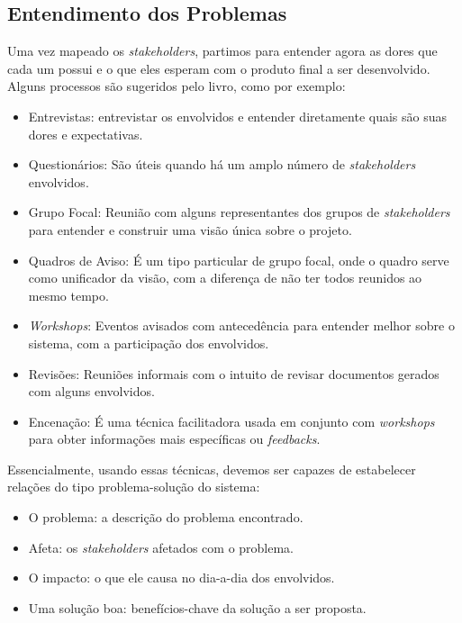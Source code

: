 \subsection{Entendimento dos Problemas}

Uma vez mapeado os \textit{stakeholders}, partimos para entender agora as dores que cada um possui e o que eles esperam com o produto final a ser desenvolvido. Alguns processos são sugeridos pelo livro\cite{kurtbittnerianspence2002}, como por exemplo:

\begin{itemize}
    \item Entrevistas: entrevistar os envolvidos e entender diretamente quais são suas dores e expectativas.
    \item Questionários: São úteis quando há um amplo número de \textit{stakeholders} envolvidos.
    \item Grupo Focal: Reunião com alguns representantes dos grupos de \textit{stakeholders} para entender e construir uma visão única sobre o projeto.
    \item Quadros de Aviso: É um tipo particular de grupo focal, onde o quadro serve como unificador da visão, com a diferença de não ter todos reunidos ao mesmo tempo.
    \item \textit{Workshops}: Eventos avisados com antecedência para entender melhor sobre o sistema, com a participação dos envolvidos.
    \item Revisões: Reuniões informais com o intuito de revisar documentos gerados com alguns envolvidos.
    \item Encenação: É uma técnica facilitadora usada em conjunto com \textit{workshops} para obter informações mais específicas ou \textit{feedbacks}.
\end{itemize}

Essencialmente, usando essas técnicas, devemos ser capazes de estabelecer relações do tipo problema-solução do sistema\cite{kurtbittnerianspence2002}:

\begin{itemize}
    \item O problema: a descrição do problema encontrado.
    \item Afeta: os \textit{stakeholders} afetados com o problema.
    \item O impacto: o que ele causa no dia-a-dia dos envolvidos.
    \item Uma solução boa: benefícios-chave da solução a ser proposta.
\end{itemize}


